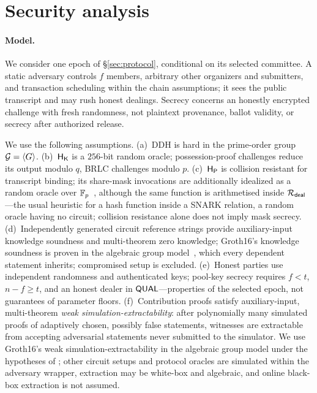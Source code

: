 \section{Security analysis}
\label{sec:security}

\paragraph{Model.}
We consider one epoch of \S\ref{sec:protocol}, conditional on its selected committee. A static adversary controls $f$ members, arbitrary other organizers and submitters, and transaction scheduling within the chain assumptions; it sees the public transcript and may rush honest dealings. Secrecy concerns an honestly encrypted challenge with fresh randomness, not plaintext provenance, ballot validity, or secrecy after authorized release.

We use the following assumptions.
(a)~DDH is hard in the prime-order group $\mathcal{G}=\langle G\rangle$.
(b)~$\mathsf{H}_{\mathsf{K}}$ is a $256$-bit random oracle; possession-proof challenges reduce its output modulo $q$, BRLC challenges modulo $p$.
(c)~$\mathsf{H}_{\mathsf{P}}$ is collision resistant for transcript binding; its share-mask invocations are additionally idealized as a random oracle over $\mathbb{F}_p$~\cite{bellare1993random}, although the same function is arithmetised inside $\mathcal{R}_{\mathsf{deal}}$---the usual heuristic for a hash function inside a SNARK relation, a random oracle having no circuit; collision resistance alone does not imply mask secrecy.
(d)~Independently generated circuit reference strings provide auxiliary-input knowledge soundness and multi-theorem zero knowledge; Groth16's knowledge soundness is proven in the algebraic group model~\cite{fuchsbauer2018agm}, which every dependent statement inherits; compromised setup is excluded.
(e)~Honest parties use independent randomness and authenticated keys; pool-key secrecy requires $f<t$, $n-f\ge t$, and an honest dealer in $\mathsf{QUAL}$---properties of the selected epoch, not guarantees of parameter floors.
(f)~Contribution proofs satisfy auxiliary-input, multi-theorem \emph{weak simulation-extractability}: after polynomially many simulated proofs of adaptively chosen, possibly false statements, witnesses are extractable from accepting adversarial statements never submitted to the simulator. We use Groth16's weak simulation-extractability in the algebraic group model under the hypotheses of \cite{baghery2021anotherlook}; other circuit setups and protocol oracles are simulated within the adversary wrapper, extraction may be white-box and algebraic, and online black-box extraction is not assumed.

